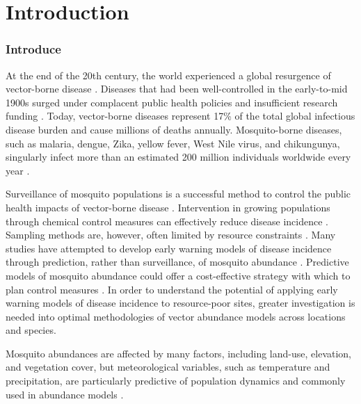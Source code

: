 \section{Introduction}
\setcounter{page}{1}

\subsubsection{Introduce}

At the end of the 20th century, the world experienced a global resurgence of vector-borne disease \citep{Gubler}. Diseases that had been well-controlled in the early-to-mid 1900s surged under complacent public health policies and insufficient research funding \citep{Gubler1998}. %
Today, vector-borne diseases represent 17\% of the total global infectious disease burden and cause millions of deaths annually. Mosquito-borne diseases, such as malaria, dengue, Zika, yellow fever, West Nile virus, and chikungunya, singularly infect more than an estimated 200 million individuals worldwide every year \citep{WHOreport}. 

Surveillance of mosquito populations is a successful method to control the public health impacts of vector-borne disease \citep{Vazquez-Prokopec2010}. Intervention in growing populations through chemical control measures can effectively reduce disease incidence \citep{Tomerini2011}. Sampling methods are, however, often limited by resource constraints \citep{Sedda2019}. Many studies have attempted to develop early warning models of disease incidence through prediction, rather than surveillance, of mosquito abundance \citep{Beck-Johnson2013, Li2019, Poh2019}. Predictive models of mosquito abundance could offer a cost-effective strategy with which to plan control measures \citep{Yang2009}.  In order to understand the potential of applying early warning models of disease incidence to resource-poor sites, greater investigation is needed into optimal methodologies of vector abundance models across locations and species. 

Mosquito abundances are affected by many factors, including land-use, elevation, and vegetation cover, but meteorological variables, such as temperature and precipitation, are particularly predictive of population dynamics and commonly used in abundance models \citep{Trawinski2008,Li 2019Wang2011,Yoo2016}. 

